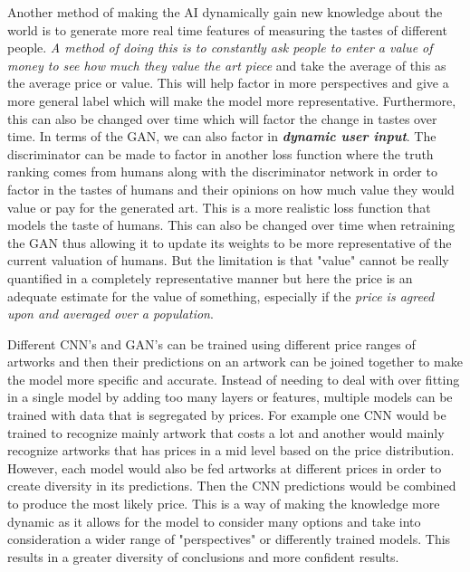 \documentclass{article}
\begin{document}
Another method of making the AI dynamically gain new knowledge about the world is to generate more real time features of measuring the tastes of different people.  \emph{A method of doing this is to constantly ask people to enter a value of money to see how much they value the art piece} and take the average of this as the average price or value. This will help factor in more perspectives and give a more general label which will make the model more representative. Furthermore, this can also be changed over time which will factor the change in tastes over time. In terms of the GAN, we can also factor in \textbf{\emph{dynamic user input}}. The discriminator can be made to factor in another loss function where the truth ranking comes from humans along with the discriminator network in order to factor in the tastes of humans and their opinions on how much value they would value or pay for the generated art. This is a more realistic loss function that models the taste of humans. This can also be changed over time when retraining the GAN thus allowing it to update its weights to be more representative of the current valuation of humans. But the limitation is that "value" cannot be really quantified in a completely representative manner but here the price is an adequate estimate for the value of something, especially if the \emph{price is agreed upon and averaged over a population}. \newline  

Different CNN's and GAN's can be trained using different price ranges of artworks and then their predictions on an artwork can be joined together to make the model more specific and accurate. Instead of needing to deal with over fitting in a single model by adding too many layers or features, multiple models can be trained with data that is segregated by prices. For example one CNN would be trained to recognize mainly artwork that costs a lot and another would mainly recognize artworks that has prices in a mid level based on the price distribution. However, each model would also be fed artworks at different prices in order to create diversity in its predictions. Then the CNN predictions would be combined to produce the most likely price. This is a way of making the knowledge more dynamic as it allows for the model to consider many options and take into consideration a wider range of "perspectives" or differently trained models. This results in a greater diversity of conclusions and more confident results. 
 
\end{document}
